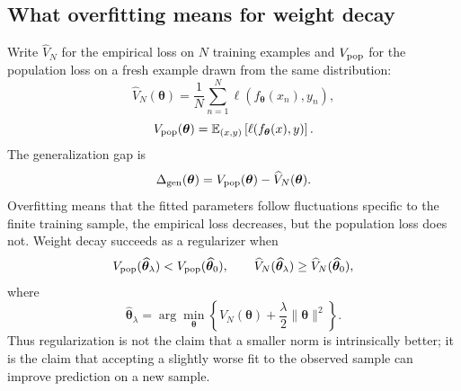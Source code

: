 \documentclass[11pt,letterpaper]{article}
\newcommand{\thet}{\bm{\theta}}
\begin{document}
\subsection{What overfitting means for weight decay}

Write \(\widehat V_N\) for the empirical loss on \(N\) training examples and
\(V_{\rm pop}\) for the population loss on a fresh example drawn from the
same distribution:
\begin{equation}
  \widehat V_N(\thet)
  =\frac1N\sum_{n=1}^N
   \ell\!\left(f_{\thet}(x_n),y_n\right),
\end{equation}
\begin{equation}
  V_{\rm pop}(\thet)
  =\mathbb E_{(x,y)}
   \left[\ell\!\left(f_{\thet}(x),y\right)\right].
\end{equation}
The generalization gap is
\begin{equation}
  \Delta_{\rm gen}(\thet)
  =V_{\rm pop}(\thet)-\widehat V_N(\thet).
\end{equation}
Overfitting means that the fitted parameters follow fluctuations specific to
the finite training sample, the empirical loss decreases, but the population
loss does not. Weight decay succeeds as a regularizer when
\begin{equation}\label{eq:weight_decay_generalization_test}
  V_{\rm pop}(\widehat{\thet}_\lambda)
  <V_{\rm pop}(\widehat{\thet}_0),
  \qquad
  \widehat V_N(\widehat{\thet}_\lambda)
  \geq\widehat V_N(\widehat{\thet}_0),
\end{equation}
where
\begin{equation}
  \widehat{\thet}_\lambda
  =\arg\min_{\thet}
   \left\{
     \widehat V_N(\thet)
     +\frac{\lambda}{2}\lVert\thet\rVert^2
   \right\}.
\end{equation}
Thus regularization is not the claim that a smaller norm is intrinsically
better; it is the claim that accepting a slightly worse fit to the observed
sample can improve prediction on a new sample.
\end{document}
